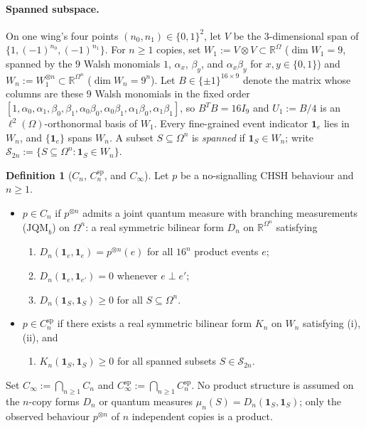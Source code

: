 \documentclass[11pt,a4paper]{article}
\theoremstyle{definition}
\newtheorem{definition}[theorem]{Definition}
\theoremstyle{remark}
\newcommand{\ind}[1]{\mathbf{1}_{#1}}
\newcommand{\JQMb}{\mathrm{JQM}_b}
\begin{document}
\paragraph{Spanned subspace.}
On one wing's four points $(n_0, n_1) \in \{0,1\}^2$, let $V$ be the $3$-dimensional span of $\{1, (-1)^{n_0}, (-1)^{n_1}\}$. For $n \ge 1$ copies, set $W_1 := V \otimes V \subset \mathbb{R}^\Omega$ ($\dim W_1 = 9$, spanned by the $9$ Walsh monomials $1$, $\alpha_x$, $\beta_y$, and $\alpha_x\beta_y$ for $x, y \in \{0,1\}$) and $W_n := W_1^{\otimes n} \subset \mathbb{R}^{\Omega^n}$ ($\dim W_n = 9^n$). Let $B \in \{\pm 1\}^{16 \times 9}$ denote the matrix whose columns are these $9$ Walsh monomials in the fixed order $[1, \alpha_0, \alpha_1, \beta_0, \beta_1, \alpha_0\beta_0, \alpha_0\beta_1, \alpha_1\beta_0, \alpha_1\beta_1]$, so $B^T B = 16 I_9$ and $U_1 := B/4$ is an $\ell^2(\Omega)$-orthonormal basis of $W_1$. Every fine-grained event indicator $\ind e$ lies in $W_n$, and $\{\ind e\}$ spans $W_n$. A subset $S \subseteq \Omega^n$ is \emph{spanned} if $\ind S \in W_n$; write $\mathcal{S}_{2n} := \{S \subseteq \Omega^n : \ind S \in W_n\}$.

\begin{definition}[$C_n$, $C_n^{\mathrm{sp}}$, and $C_\infty$]\label{d:cn}
Let $p$ be a no-signalling CHSH behaviour and $n \ge 1$.
\begin{itemize}
  \item $p \in C_n$ if $p^{\otimes n}$ admits a joint quantum measure with branching measurements ($\JQMb$) on $\Omega^n$: a real symmetric bilinear form $D_n$ on $\mathbb{R}^{\Omega^n}$ satisfying
  \begin{enumerate}
    \item[(i)] $D_n(\ind e, \ind e) = p^{\otimes n}(e)$ for all $16^n$ product events $e$;
    \item[(ii)] $D_n(\ind e, \ind{e'}) = 0$ whenever $e \perp e'$;
    \item[(iii)] $D_n(\ind S, \ind S) \ge 0$ for all $S \subseteq \Omega^n$.
  \end{enumerate}
  \item $p \in C_n^{\mathrm{sp}}$ if there exists a real symmetric bilinear form $K_n$ on $W_n$ satisfying (i), (ii), and
  \begin{enumerate}
    \item[(iii$'$)] $K_n(\ind S, \ind S) \ge 0$ for all spanned subsets $S \in \mathcal{S}_{2n}$.
  \end{enumerate}
\end{itemize}
Set $C_\infty := \bigcap_{n \ge 1} C_n$ and $C_\infty^{\mathrm{sp}} := \bigcap_{n \ge 1} C_n^{\mathrm{sp}}$. No product structure is assumed on the $n$-copy forms $D_n$ or quantum measures $\mu_n(S) = D_n(\ind S, \ind S)$; only the observed behaviour $p^{\otimes n}$ of $n$ independent copies is a product.
\end{definition}
\end{document}
